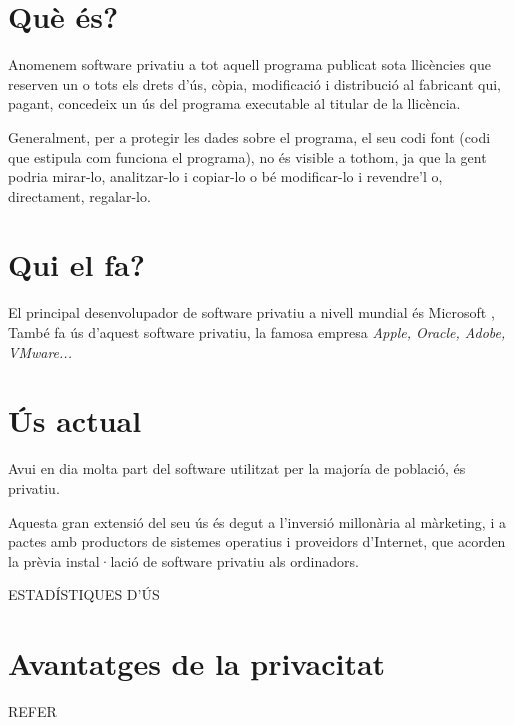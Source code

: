 \section{Què és?}

Anomenem software privatiu a tot aquell programa publicat sota llicències
que reserven un o tots els drets d'ús, còpia, modificació i distribució
al fabricant qui, pagant, concedeix un ús del programa executable al titular
de la llicència.

Generalment, per a protegir les dades sobre el programa, el seu codi font
(codi que estipula com funciona el programa), no és visible a tothom, ja 
que la gent podria mirar-lo, analitzar-lo i copiar-lo o bé modificar-lo i
revendre'l o, directament, regalar-lo. \cite{ProgPro}\cite{gnucategories}

\section{Qui el fa?}

El principal desenvolupador de software privatiu a nivell mundial és Microsoft
\cite{gnumicrosoft}, 
També fa ús d'aquest software privatiu, la famosa empresa \emph{Apple, Oracle, Adobe,
VMware...}

\section{Ús actual}

Avui en dia molta part del software utilitzat per la majoría de població, és privatiu.

Aquesta gran extensió del seu ús és degut a l'inversió millonària al màrketing, i a
pactes amb productors de sistemes operatius i proveidors d'Internet, que acorden la
prèvia instal·lació de software privatiu als ordinadors.

ESTADÍSTIQUES D'ÚS

\section{Avantatges de la privacitat}

REFER


